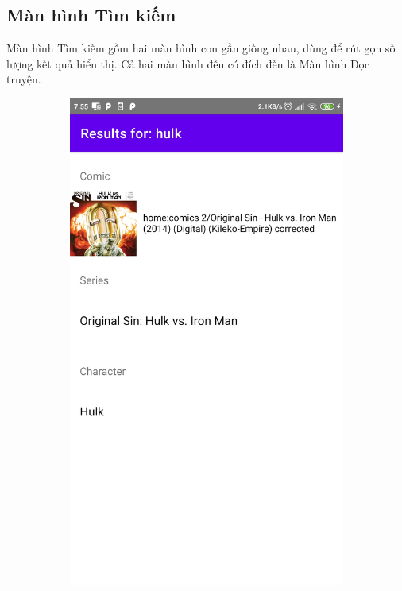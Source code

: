 \documentclass[../../thesis]{subfiles}
\begin{document}
\subsection{Màn hình Tìm kiếm}

Màn hình Tìm kiếm gồm hai màn hình con gần giống nhau, dùng để rút gọn số lượng
kết quả hiển thị. Cả hai màn hình đều có đích đến là Màn hình Đọc truyện.

\begin{figure}[H]
    \centering
    \begin{subfigure}[b]{0.49\textwidth}
        \centering
        \includegraphics[scale=0.12]{../images/Screenshot_2021-05-25-07-55-58-349_com.uet.nvmnghia.yacv}

\end{subfigure}
\end{figure}
\end{document}
